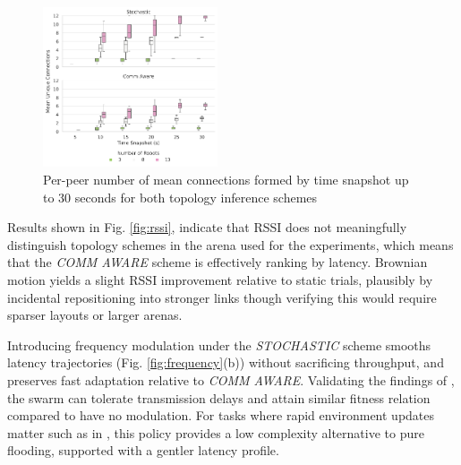 \documentclass[conference]{IEEEtran}
\begin{document}
\begin{figure}[H]
    \centering
    \includegraphics[width=0.46\textwidth]{unique_connections.pdf}
    \caption{Per-peer number of mean connections formed by time snapshot up to 30 seconds for both topology inference schemes}
    \label{fig:unique-connections}
\end{figure}

Results shown in Fig. \ref{fig:rssi}, indicate that RSSI does not meaningfully distinguish topology schemes in the arena used for the experiments, which means that the \emph{COMM AWARE} scheme is effectively ranking by latency. Brownian motion yields a slight RSSI improvement relative to static trials, plausibly by incidental repositioning into stronger links though verifying this would require sparser layouts or larger arenas.


Introducing frequency modulation under the \emph{STOCHASTIC} scheme smooths latency trajectories (Fig. \ref{fig:frequency}(b)) without sacrificing throughput, and preserves fast adaptation relative to \emph{COMM AWARE}. Validating the findings of \cite{tsianos_impact_2012}, the swarm can tolerate transmission delays and attain similar fitness relation compared to have no modulation. For tasks where rapid environment updates matter such as in \cite{perrin_decentralised_2012}, this policy provides a low complexity alternative to pure flooding, supported with a gentler latency profile.
\end{document}
